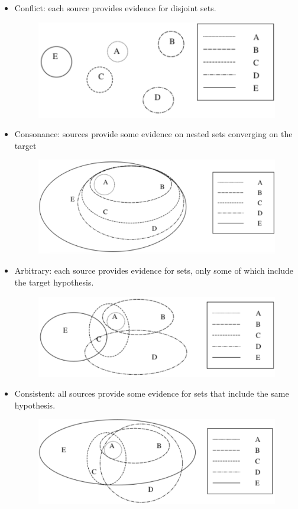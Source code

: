 \documentclass[12pt, a4paper]{report}
\newtheorem[L]{theorem}{Theorem}
\newtheorem[M]{corollary}{Corollary}
\newtheorem[M]{lemma}{Lemma}
\newtheorem[style=S,bodystyle=\normalfont]{definition}{Definition}
\begin{document}
    \begin{itemize}
        \item Conflict: each source provides evidence for disjoint sets. 
            \begin{figure}[H]
                \centering
                \includegraphics[width=0.5\linewidth]{images/conflict.png}
            \end{figure}
        \item Consonance: sources provide some evidence on nested sets converging on the target
            \begin{figure}[H]
                \centering
                \includegraphics[width=0.5\linewidth]{images/consonance.png}
            \end{figure}
        \item Arbitrary: each source provides evidence for sets, only some of which include the target hypothesis. 
            \begin{figure}[H]
                \centering
                \includegraphics[width=0.5\linewidth]{images/arbitrary.png}
            \end{figure}
        \item Consistent: all sources provide some evidence for sets that include the same hypothesis. 
            \begin{figure}[H]
                \centering
                \includegraphics[width=0.5\linewidth]{images/consistent.png}
            \end{figure}
    \end{itemize}
\end{document}
